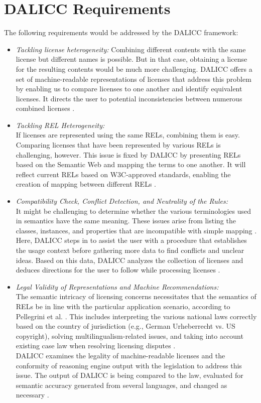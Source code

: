\section{DALICC Requirements}
The following requirements would be addressed by the DALICC framework: 
\begin{itemize}
\item \textit{Tackling license heterogeneity:} 
Combining different contents with the same license but different names is possible. But in that case, obtaining a license for the resulting contents would be much more challenging. DALICC offers a set of machine-readable representations of licenses that address this problem by enabling us to compare licenses to one another and identify equivalent licenses. It directs the user to potential inconsistencies between numerous combined licenses \cite{Anna}.
\item \textit{Tackling REL Heterogeneity:} \\
If licenses are represented using the same RELs, combining them is easy. Comparing licenses that have been represented by various RELs is challenging, however. This issue is fixed by DALICC by presenting RELs based on the Semantic Web and mapping the terms to one another. It will reflect current RELs based on W3C-approved standards, enabling the creation of mapping between different RELs \cite{Anna}.
\item \textit{Compatibility Check, Conflict Detection, and Neutrality of the Rules:}\\
It might be challenging to determine whether the various terminologies used in semantics have the same meaning. These issues arise from listing the classes, instances, and properties that are incompatible with simple mapping \cite{Anna}. \\
Here, DALICC steps in to assist the user with a procedure that establishes the usage context before gathering more data to find conflicts and unclear ideas. Based on this data, DALICC analyzes the collection of licenses and deduces directions for the user to follow while processing licenses \cite{Anna}. \\
\item \textit{Legal Validity of Representations and Machine Recommendations:} \\
The semantic intricacy of licensing concerns necessitates that the semantics of RELs be in line with the particular application scenario, according to Pellegrini et al. \cite{Anna}. This includes interpreting the various national laws correctly based on the country of jurisdiction (e.g., German Urheberrecht vs. US copyright), solving multilingualism-related issues, and taking into account existing case law when resolving licensing disputes \cite{Anna}.\\
DALICC examines the legality of machine-readable licenses and the conformity of reasoning engine output with the legislation to address this issue. The output of DALICC is being compared to the law, evaluated for semantic accuracy generated from several languages, and changed as necessary \cite{Anna}.
\end{itemize}
\\
